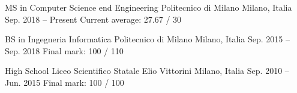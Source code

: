 

\begin{cventries}

\cventry
    {MS in Computer Science end Engineering}
    {Politecnico di Milano}
    {Milano, Italia}
    {Sep. 2018 -- Present}
    {Current average: 27.67 / 30}
    
\cventry
    {BS in Ingegneria Informatica}
    {Politecnico di Milano}
    {Milano, Italia}
    {Sep. 2015 -- Sep. 2018}
    {Final mark: 100 / 110}
    
\cventry
    {High School}
    {Liceo Scientifico Statale Elio Vittorini}
    {Milano, Italia}
    {Sep. 2010 -- Jun. 2015}
    {Final mark: 100 / 100}
\end{cventries}


